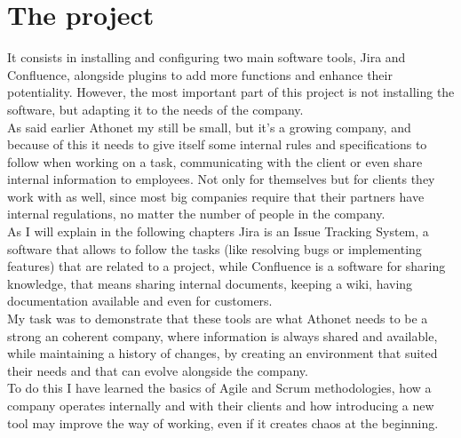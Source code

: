 \section{The project}
	It consists in installing and configuring two main software tools, Jira and Confluence, alongside plugins to add more functions and enhance their potentiality.
	However, the most important part of this project is not installing the software, but adapting it to the needs of the company.\\
	As said earlier Athonet my still be small, but it's a growing company, and because of this it needs to give itself some internal rules and specifications to follow when working on a task, communicating with the client or even share internal information to employees.
	Not only for themselves but for clients they work with as well, since most big companies require that their partners have internal regulations, no matter the number of people in the company.\\
	As I will explain in the following chapters Jira is an Issue Tracking System, a software that allows to follow the tasks (like resolving bugs or implementing features) that are related to a project, while Confluence is a software for sharing knowledge, that means sharing internal documents, keeping a wiki, having documentation available and even for customers.\\
	My task was to demonstrate that these tools are what Athonet needs to be a strong an coherent company, where information is always shared and available, while maintaining a history of changes, by creating an environment that suited their needs and that can evolve alongside the company.\\
	To do this I have learned the basics of Agile and Scrum methodologies, how a company operates internally and with their clients and how introducing a new tool may improve the way of working, even if it creates chaos at the beginning.

